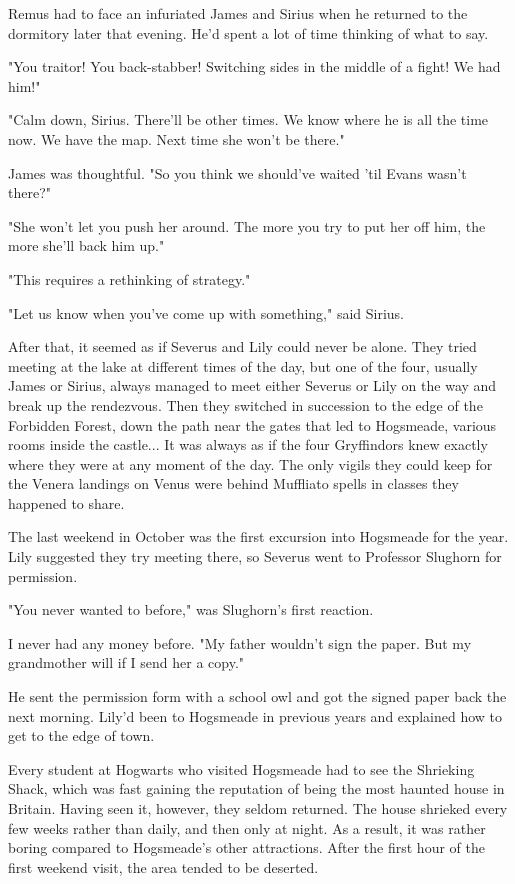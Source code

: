 \documentclass[a4paper,11pt]{article}
\begin{document}
Remus had to face an infuriated James and Sirius when he returned to the dormitory later that evening. He'd spent a lot of time thinking of what to say.

"You traitor! You back-stabber! Switching sides in the middle of a fight! We had him!"

"Calm down, Sirius. There'll be other times. We know where he is all the time now. We have the map. Next time she won't be there."

James was thoughtful. "So you think we should've waited 'til Evans wasn't there?"

"She won't let you push her around. The more you try to put her off him, the more she'll back him up."

"This requires a rethinking of strategy."

"Let us know when you've come up with something," said Sirius.

After that, it seemed as if Severus and Lily could never be alone. They tried meeting at the lake at different times of the day, but one of the four, usually James or Sirius, always managed to meet either Severus or Lily on the way and break up the rendezvous. Then they switched in succession to the edge of the Forbidden Forest, down the path near the gates that led to Hogsmeade, various rooms inside the castle... It was always as if the four Gryffindors knew exactly where they were at any moment of the day. The only vigils they could keep for the Venera landings on Venus were behind Muffliato spells in classes they happened to share.

The last weekend in October was the first excursion into Hogsmeade for the year. Lily suggested they try meeting there, so Severus went to Professor Slughorn for permission.

"You never wanted to before," was Slughorn's first reaction.

I never had any money before. "My father wouldn't sign the paper. But my grandmother will if I send her a copy."

He sent the permission form with a school owl and got the signed paper back the next morning. Lily'd been to Hogsmeade in previous years and explained how to get to the edge of town.

Every student at Hogwarts who visited Hogsmeade had to see the Shrieking Shack, which was fast gaining the reputation of being the most haunted house in Britain. Having seen it, however, they seldom returned. The house shrieked every few weeks rather than daily, and then only at night. As a result, it was rather boring compared to Hogsmeade's other attractions. After the first hour of the first weekend visit, the area tended to be deserted.
\end{document}
